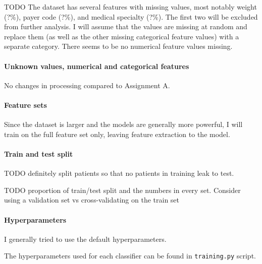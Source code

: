 \documentclass[10pt, twocolumn]{article}
\begin{document}
TODO The dataset has several features with missing values, most notably weight (?\%), payer code (?\%), and medical specialty (?\%). The first two will be excluded from further analysis. I will assume that the values are missing at random and replace them (as well as the other missing categorical feature values) with a separate category. There seems to be no numerical feature values missing.

\paragraph{Unknown values, numerical and categorical features} No changes in processing compared to Assignment A.

\paragraph{Feature sets} Since the dataset is larger and the models are generally more powerful, I will train on the full feature set only, leaving feature extraction to the model.

\paragraph{Train and test split} 
TODO definitely split patients so that no patients in training leak to test.

TODO proportion of train/test split and the numbers in every set. Consider using a validation set vs cross-validating on the train set 

\paragraph{Hyperparameters} I generally tried to use the default hyperparameters. 

The hyperparameters used for each classifier can be found in \texttt{training.py} script.


\medskip
 


\end{document}
